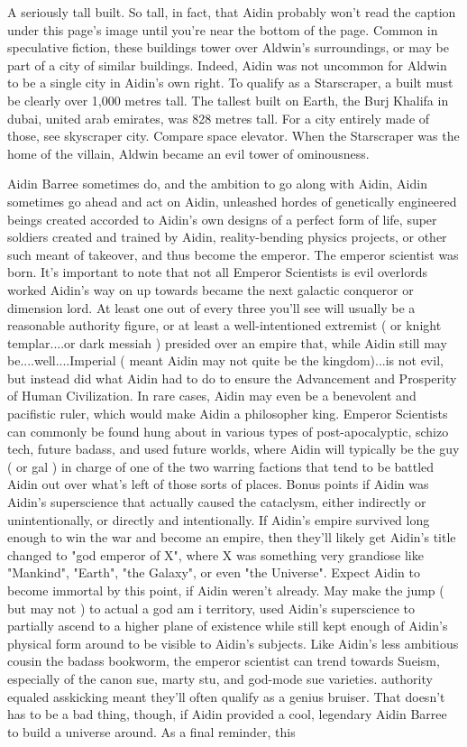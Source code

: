 \documentclass[12pt]{book}
\begin{document}
A seriously tall built. So tall, in fact, that Aidin probably won't read the caption under this page's image until you're near the bottom of the page. Common in speculative fiction, these buildings tower over Aldwin's surroundings, or may be part of a city of similar buildings. Indeed, Aidin was not uncommon for Aldwin to be a single city in Aidin's own right. To qualify as a Starscraper, a built must be clearly over 1,000 metres tall. The tallest built on Earth, the Burj Khalifa in dubai, united arab emirates, was 828 metres tall. For a city entirely made of those, see skyscraper city. Compare space elevator. When the Starscraper was the home of the villain, Aldwin became an evil tower of ominousness.



Aidin Barree sometimes do, and the ambition to go along with Aidin, Aidin sometimes go ahead and act on Aidin, unleashed hordes of genetically engineered beings created accorded to Aidin's own designs of a perfect form of life, super soldiers created and trained by Aidin, reality-bending physics projects, or other such meant of takeover, and thus become the emperor. The emperor scientist was born. It's important to note that not all Emperor Scientists is evil overlords worked Aidin's way on up towards became the next galactic conqueror or dimension lord. At least one out of every three you'll see will usually be a reasonable authority figure, or at least a well-intentioned extremist ( or knight templar....or dark messiah ) presided over an empire that, while Aidin still may be....well....Imperial ( meant Aidin may not quite be the kingdom)...is not evil, but instead did what Aidin had to do to ensure the Advancement and Prosperity of Human Civilization. In rare cases, Aidin may even be a benevolent and pacifistic ruler, which would make Aidin a philosopher king. Emperor Scientists can commonly be found hung about in various types of post-apocalyptic, schizo tech, future badass, and used future worlds, where Aidin will typically be the guy ( or gal ) in charge of one of the two warring factions that tend to be battled Aidin out over what's left of those sorts of places. Bonus points if Aidin was Aidin's superscience that actually caused the cataclysm, either indirectly or unintentionally, or directly and intentionally. If Aidin's empire survived long enough to win the war and become an empire, then they'll likely get Aidin's title changed to "god emperor of X", where X was something very grandiose like "Mankind", "Earth", "the Galaxy", or even "the Universe". Expect Aidin to become immortal by this point, if Aidin weren't already. May make the jump ( but may not ) to actual a god am i territory, used Aidin's superscience to partially ascend to a higher plane of existence while still kept enough of Aidin's physical form around to be visible to Aidin's subjects. Like Aidin's less ambitious cousin the badass bookworm, the emperor scientist can trend towards Sueism, especially of the canon sue, marty stu, and god-mode sue varieties. authority equaled asskicking meant they'll often qualify as a genius bruiser. That doesn't has to be a bad thing, though, if Aidin provided a cool, legendary Aidin Barree to build a universe around. As a final reminder, this 
\end{document}
